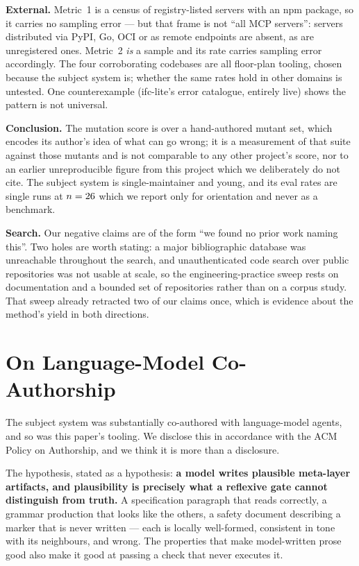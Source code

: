 \documentclass[10pt,journal,compsoc]{IEEEtran}
\begin{document}
\textbf{External.} Metric~1 is a census of registry-listed servers with an npm package,
so it carries no sampling error --- but that frame is not ``all MCP servers'': servers
distributed via PyPI, Go, OCI or as remote endpoints are absent, as are unregistered
ones. Metric~2 \emph{is} a sample and its rate carries sampling error accordingly. The
four corroborating codebases are all floor-plan tooling, chosen because the subject
system is; whether the same rates hold in other domains is untested. One counterexample
(ifc-lite's error catalogue, entirely live) shows the pattern is not universal.

\textbf{Conclusion.} The mutation score is over a hand-authored mutant set, which
encodes its author's idea of what can go wrong; it is a measurement of that suite
against those mutants and is not comparable to any other project's score, nor to an
earlier unreproducible figure from this project which we deliberately do not cite. The
subject system is single-maintainer and young, and its eval rates are single runs at
$n = 26{}$ which we report only for orientation and never as a benchmark.

\textbf{Search.} Our negative claims are of the form ``we found no prior work naming
this''. Two holes are worth stating: a major bibliographic database was unreachable
throughout the search, and unauthenticated code search over public repositories was not
usable at scale, so the engineering-practice sweep rests on documentation and a bounded
set of repositories rather than on a corpus study. That sweep already retracted two of
our claims once, which is evidence about the method's yield in both directions.

\section{On Language-Model Co-Authorship}\label{sec:ai}

The subject system was substantially co-authored with language-model agents, and so was
this paper's tooling. We disclose this in accordance with the ACM Policy on Authorship,
and we think it is more than a disclosure.

The hypothesis, stated as a hypothesis: \textbf{a model writes plausible meta-layer
artifacts, and plausibility is precisely what a reflexive gate cannot distinguish from
truth.} A specification paragraph that reads correctly, a grammar production that looks
like the others, a safety document describing a marker that is never written --- each is
locally well-formed, consistent in tone with its neighbours, and wrong. The properties
that make model-written prose good also make it good at passing a check that never
executes it.
\end{document}
